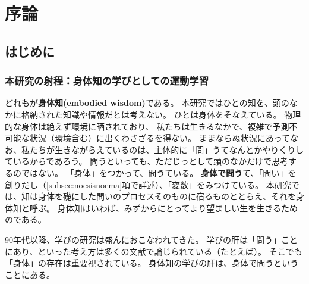 

\part*{序論}
\chapter{はじめに}
\label{chapter:hajimeni}

\section{本研究の射程：身体知の学びとしての運動学習}
\label{sec:embodiedwisdomlearning}



どれもが\textbf{身体知(embodied wisdom)}である\cite{suwa:2016, suwa:2022}。
本研究ではひとの知を、頭のなかに格納された知識や情報だとは考えない。
ひとは身体をそなえている。
物理的な身体は絶えず環境に晒されており、
私たちは生きるなかで、複雑で予測不可能な状況（環境含む）に出くわさざるを得ない。
ままならぬ状況にあってなお、私たちが生きながらえているのは、主体的に「問」うてなんとかやりくり\cite{decerteau:1980}しているからであろう。
問うといっても、ただじっとして頭のなかだけで思考するのではない。
「身体」をつかって、問うている。
\textbf{身体で問う}て、「問い」を創りだし（\ref{subsec:noesisnoema}項で詳述）、「変数」\cite{gibson_gibson_1955}をみつけている。
本研究では、知は身体を礎にした問いのプロセスそのものに宿るものととらえ、それを身体知と呼ぶ。
身体知はいわば、みずからにとってより望ましい生を生きるためのである。



90年代以降、学びの研究は盛んにおこなわれてきた。
学びの肝は「問う」ことにあり、といった考え方は多くの文献で論じられている（たとえば\cite{saeki:1995,suwa:2016,suwa:2022}）。
そこでも「身体」の存在は重要視されている。
身体知の学びの肝は、身体で問うということにある。

